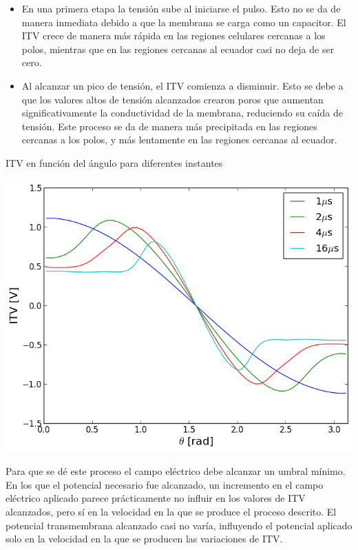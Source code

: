\documentclass[a0,portrait]{a0poster}
\begin{document}
\begin{multicols}{2}
\begin{itemize}
	\item En una primera etapa la tensión sube al iniciarse el pulso. Esto no se da de manera inmediata debido a que la membrana se carga como un capacitor. El ITV crece de manera más rápida en las regiones celulares cercanas a los polos, mientras que en las regiones cercanas al ecuador casi no deja de ser cero.
	\item Al alcanzar un pico de tensión, el ITV comienza a disminuir. Esto se debe a que los valores altos de tensión alcanzados crearon poros que aumentan significativamente la conductividad de la membrana, reduciendo su caída de tensión. Este proceso se da de manera más precipitada en las regiones cercanas a los polos, y más lentamente en las regiones cercanas al ecuador. 
\end{itemize}

\begin{multicols}{2}
	ITV en función del ángulo para diferentes instantes
	\begin{center}\vspace{1cm}
	\includegraphics[width=1\linewidth]{itv-tita-50-64-80KVm}
	\end{center}\vspace{1cm}
	
\columnbreak
	Para que se dé este proceso el campo eléctrico debe alcanzar un umbral mínimo. En los que el potencial necesario fue alcanzado, un incremento en el campo eléctrico aplicado parece prácticamente no influir en los valores de ITV alcanzados, pero sí en la velocidad en la que se produce el proceso descrito. El potencial transmembrana alcanzado casi no varía, influyendo el potencial aplicado solo en la velocidad en la que se producen las variaciones de ITV.\\
\end{multicols}



\end{multicols}
\end{document}
